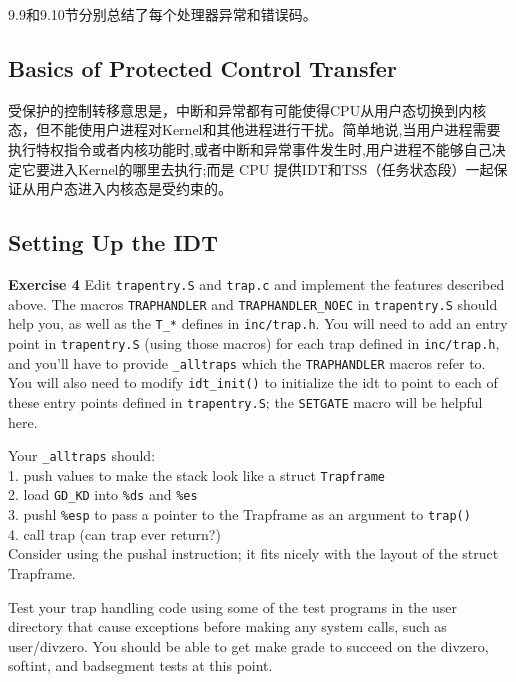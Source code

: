 \documentclass[11pt]{article}
\begin{document}
9.9和9.10节分别总结了每个处理器异常和错误码。

\subsection{Basics of Protected Control Transfer}
受保护的控制转移意思是，中断和异常都有可能使得CPU从用户态切换到内核态，但不能使用户进程对Kernel和其他进程进行干扰。简单地说,当用户进程需要执行特权指令或者内核功能时,或者中断和异常事件发生时,用户进程不能够自己决定它要进入Kernel的哪里去执行;而是 CPU 提供IDT和TSS（任务状态段）一起保证从用户态进入内核态是受约束的。

\subsection{Setting Up the IDT}
\begin{framed}
\noindent\textbf{Exercise 4} Edit \lstinline|trapentry.S| and \lstinline|trap.c| and implement the features described above. The macros \lstinline|TRAPHANDLER| and \lstinline|TRAPHANDLER_NOEC| in \lstinline|trapentry.S| should help you, as well as the \lstinline|T_*| defines in \lstinline|inc/trap.h|. You will need to add an entry point in \lstinline|trapentry.S| (using those macros) for each trap defined in \lstinline|inc/trap.h|, and you'll have to provide \lstinline|_alltraps| which the \lstinline|TRAPHANDLER| macros refer to. You will also need to modify \lstinline|idt_init()| to initialize the idt to point to each of these entry points defined in \lstinline|trapentry.S|; the \lstinline|SETGATE| macro will be helpful here.

Your \lstinline|_alltraps| should:
\\
1. push values to make the stack look like a struct \lstinline|Trapframe| \\
2. load \lstinline|GD_KD| into \lstinline|%ds| and \lstinline|%es| \\
3. pushl \lstinline|%esp| to pass a pointer to the Trapframe as an argument to \lstinline|trap()| \\
4. call trap (can trap ever return?) \\

Consider using the pushal instruction; it fits nicely with the layout of the struct Trapframe.

Test your trap handling code using some of the test programs in the user directory that cause exceptions before making any system calls, such as user/divzero. You should be able to get make grade to succeed on the divzero, softint, and badsegment tests at this point. 
\end{framed}
\end{document}
